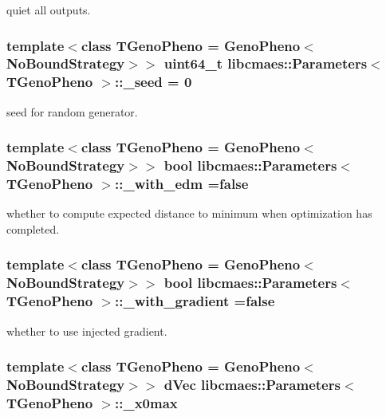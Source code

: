 quiet all outputs. \hypertarget{classlibcmaes_1_1Parameters_ac6d616c3d5295fec8a0b230592fb767a}{
\subsubsection[{\-\_\-seed}]{\setlength{\rightskip}{0pt plus 5cm}template$<$class T\-Geno\-Pheno = Geno\-Pheno$<$\-No\-Bound\-Strategy$>$$>$ uint64\-\_\-t {\bf libcmaes\-::\-Parameters}$<$ T\-Geno\-Pheno $>$\-::\-\_\-seed = 0}}\label{classlibcmaes_1_1Parameters_ac6d616c3d5295fec8a0b230592fb767a}
seed for random generator. \hypertarget{classlibcmaes_1_1Parameters_adbaa11317ae66061e097c372522b8758}{
\subsubsection[{\-\_\-with\-\_\-edm}]{\setlength{\rightskip}{0pt plus 5cm}template$<$class T\-Geno\-Pheno = Geno\-Pheno$<$\-No\-Bound\-Strategy$>$$>$ bool {\bf libcmaes\-::\-Parameters}$<$ T\-Geno\-Pheno $>$\-::\-\_\-with\-\_\-edm =false}}\label{classlibcmaes_1_1Parameters_adbaa11317ae66061e097c372522b8758}
whether to compute expected distance to minimum when optimization has completed. \hypertarget{classlibcmaes_1_1Parameters_aff76cebbfef51c20398aab8f49a3676a}{
\subsubsection[{\-\_\-with\-\_\-gradient}]{\setlength{\rightskip}{0pt plus 5cm}template$<$class T\-Geno\-Pheno = Geno\-Pheno$<$\-No\-Bound\-Strategy$>$$>$ bool {\bf libcmaes\-::\-Parameters}$<$ T\-Geno\-Pheno $>$\-::\-\_\-with\-\_\-gradient =false}}\label{classlibcmaes_1_1Parameters_aff76cebbfef51c20398aab8f49a3676a}
whether to use injected gradient. \hypertarget{classlibcmaes_1_1Parameters_aece9694af9bee78bb13b0994db7ac45e}{
\subsubsection[{\-\_\-x0max}]{\setlength{\rightskip}{0pt plus 5cm}template$<$class T\-Geno\-Pheno = Geno\-Pheno$<$\-No\-Bound\-Strategy$>$$>$ d\-Vec {\bf libcmaes\-::\-Parameters}$<$ T\-Geno\-Pheno $>$\-::\-\_\-x0max}}\label{classlibcmaes_1_1Parameters_aece9694af9bee78bb13b0994db7ac45e}
